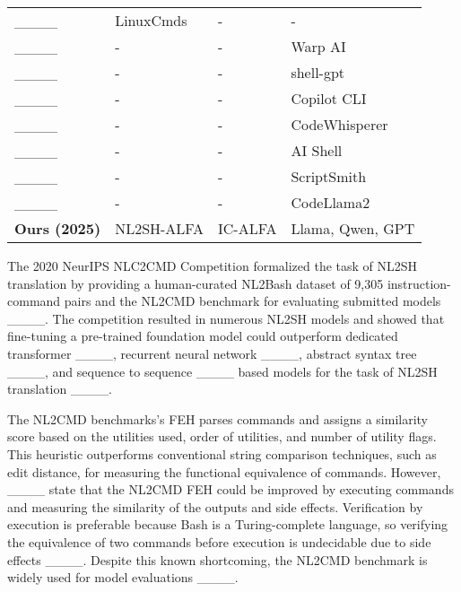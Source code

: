 \begin{table}[ht!]
\begin{tabular}{llll}
    ____        & LinuxCmds         & -             & -                \\
    ____            & -                 & -             & Warp AI          \\
    ____       & -                 & -             & shell-gpt        \\
    ____         & -                 & -             & Copilot CLI      \\
    ____            & -                 & -             & CodeWhisperer    \\
    ____            & -                 & -             & AI Shell         \\
    ____     & -                 & -             & ScriptSmith      \\
    ____  & -                 & -             & CodeLlama2       \\ \hline
    \textbf{Ours (2025)}    & NL2SH-ALFA        & IC-ALFA       & Llama, Qwen, GPT \\ \hline
  \end{tabular}
  \label{tab:related}
\end{table}

The 2020 NeurIPS NLC2CMD Competition formalized the task of NL2SH translation by providing a human-curated NL2Bash dataset of 9,305 instruction-command pairs and the NL2CMD benchmark for evaluating submitted models ____. The competition resulted in numerous NL2SH models and showed that fine-tuning a pre-trained foundation model could outperform dedicated transformer ____, recurrent neural network ____, abstract syntax tree ____, and sequence to sequence ____ based models for the task of NL2SH translation ____.

The NL2CMD benchmarks's FEH parses commands and assigns a similarity score based on the utilities used, order of utilities, and number of utility flags. This heuristic outperforms conventional string comparison techniques, such as edit distance, for measuring the functional equivalence of commands. However, ____ state that the NL2CMD FEH could be improved by executing commands and measuring the similarity of the outputs and side effects. Verification by execution is preferable because Bash is a Turing-complete language, so verifying the equivalence of two commands before execution is undecidable due to side effects ____. Despite this known shortcoming, the NL2CMD benchmark is widely used for model evaluations ____.

